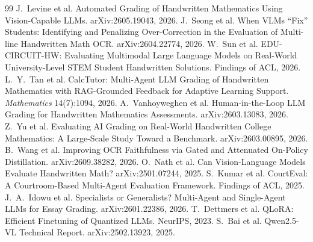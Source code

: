 \documentclass[11pt,a4paper]{article}
\begin{document}
\begin{thebibliography}{99}\footnotesize\setlength{\itemsep}{0pt}\setlength{\parsep}{0pt}
 J.~Levine et al. Automated Grading of Handwritten Mathematics Using Vision-Capable LLMs. arXiv:2605.19043, 2026.
 J.~Seong et al. When VLMs ``Fix'' Students: Identifying and Penalizing Over-Correction in the Evaluation of Multi-line Handwritten Math OCR. arXiv:2604.22774, 2026.
 W.~Sun et al. EDU-CIRCUIT-HW: Evaluating Multimodal Large Language Models on Real-World University-Level STEM Student Handwritten Solutions. Findings of ACL, 2026.
 L.~Y.~Tan et al. CalcTutor: Multi-Agent LLM Grading of Handwritten Mathematics with RAG-Grounded Feedback for Adaptive Learning Support. \emph{Mathematics} 14(7):1094, 2026.
 A.~Vanhoyweghen et al. Human-in-the-Loop LLM Grading for Handwritten Mathematics Assessments. arXiv:2603.13083, 2026.
 Z.~Yu et al. Evaluating AI Grading on Real-World Handwritten College Mathematics: A Large-Scale Study Toward a Benchmark. arXiv:2603.00895, 2026.
 B.~Wang et al. Improving OCR Faithfulness via Gated and Attenuated On-Policy Distillation. arXiv:2609.38282, 2026.
 O.~Nath et al. Can Vision-Language Models Evaluate Handwritten Math? arXiv:2501.07244, 2025.
 S.~Kumar et al. CourtEval: A Courtroom-Based Multi-Agent Evaluation Framework. Findings of ACL, 2025.
 J.~A.~Idowu et al. Specialists or Generalists? Multi-Agent and Single-Agent LLMs for Essay Grading. arXiv:2601.22386, 2026.
 T.~Dettmers et al. QLoRA: Efficient Finetuning of Quantized LLMs. NeurIPS, 2023.
 S.~Bai et al. Qwen2.5-VL Technical Report. arXiv:2502.13923, 2025.
\end{thebibliography}
\end{document}
